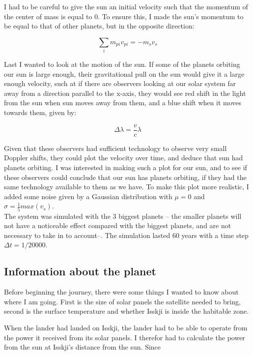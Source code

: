 \documentclass[a4paper, 10pt]{article}
\begin{document}
I had to be careful to give the sun an initial velocity such that the momentum of the center of mass is equal to 0. To ensure this, I made the sun's momentum to be equal to that of other planets, but in the opposite direction:

\begin{equation}
\sum\limits_i m_{pi}v_{pi} = -m_sv_s
\end{equation}

Last I wanted to look at the motion of the sun. If some of the planets orbiting our sun is large enough, their gravitational pull on the sun would give it a large enough velocity, such at if there are observers looking at our solar system far away from a direction parallel to the x-axis, they would see red shift in the light from the sun when sun moves away from them, and a blue shift when it moves towards them, given by:

\begin{equation}
\Delta \lambda = \frac{v}{c}\lambda
\end{equation}

Given that these observers had sufficient technology to observe very small Doppler shifts, they could plot the velocity over time, and deduce that sun had planets orbiting. I was interested in making such a plot for our sun, and to see if these observers could conclude that our sun has planets orbiting, if they had the same technology available to them as we have. To make this plot more realistic, I added some noise given by a Gaussian distribution with $\mu = 0$ and $\sigma = \frac{1}{5} max(v_s)$.\\

The system was simulated with the 3 biggest planets -- the smaller planets will not have a noticeable effect compared with the biggest planets, and are not necessary to take in to account--. The simulation lasted 60 years with a time step $\Delta t = 1/20000$.

\subsection{Information about the planet}
Before beginning the journey, there were some things I wanted to know about where I am going. First is the size of solar panels the satellite needed to bring, second is the surface temperature and whether Isskji is inside the habitable zone.

When the lander had landed on Isskji, the lander had to be able to operate from the power it received from its solar panels. I therefor had to calculate the power from the sun at Isskji's distance from the sun. Since 
\end{document}
